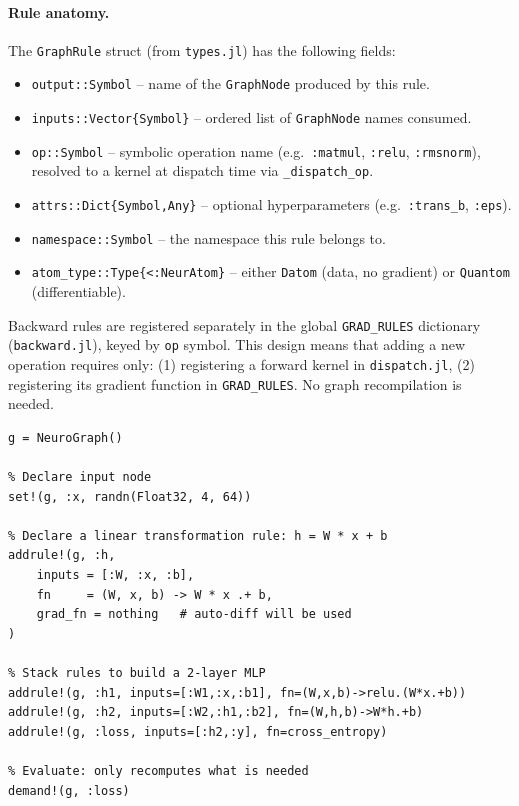 \documentclass{article}
\begin{document}
\paragraph{Rule anatomy.} The \texttt{GraphRule} struct (from \texttt{types.jl}) has the following fields:
\begin{itemize}
  \item \texttt{output::Symbol} -- name of the \texttt{GraphNode} produced by this rule.
  \item \texttt{inputs::Vector\{Symbol\}} -- ordered list of \texttt{GraphNode} names consumed.
  \item \texttt{op::Symbol} -- symbolic operation name (e.g.\ \texttt{:matmul}, \texttt{:relu}, \texttt{:rmsnorm}), resolved to a kernel at dispatch time via \texttt{\_dispatch\_op}.
  \item \texttt{attrs::Dict\{Symbol,Any\}} -- optional hyperparameters (e.g.\ \texttt{:trans\_b}, \texttt{:eps}).
  \item \texttt{namespace::Symbol} -- the namespace this rule belongs to.
  \item \texttt{atom\_type::Type\{<:NeurAtom\}} -- either \texttt{Datom} (data, no gradient) or \texttt{Quantom} (differentiable).
\end{itemize}

Backward rules are registered separately in the global \texttt{GRAD\_RULES} dictionary (\texttt{backward.jl}), keyed by \texttt{op} symbol. This design means that adding a new operation requires only: (1) registering a forward kernel in \texttt{dispatch.jl}, (2) registering its gradient function in \texttt{GRAD\_RULES}. No graph recompilation is needed.

\begin{lstlisting}[caption={Rule DSL usage}, label={lst:rule_dsl}]
g = NeuroGraph()

% Declare input node
set!(g, :x, randn(Float32, 4, 64))

% Declare a linear transformation rule: h = W * x + b
addrule!(g, :h,
    inputs = [:W, :x, :b],
    fn     = (W, x, b) -> W * x .+ b,
    grad_fn = nothing   # auto-diff will be used
)

% Stack rules to build a 2-layer MLP
addrule!(g, :h1, inputs=[:W1,:x,:b1], fn=(W,x,b)->relu.(W*x.+b))
addrule!(g, :h2, inputs=[:W2,:h1,:b2], fn=(W,h,b)->W*h.+b)
addrule!(g, :loss, inputs=[:h2,:y], fn=cross_entropy)

% Evaluate: only recomputes what is needed
demand!(g, :loss)
\end{lstlisting}
\end{document}
